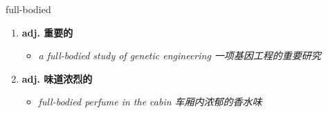 
\begin{frame}
{\huge full-bodied}
\begin{center}
\begin{enumerate}\Large
  \item \textbf{adj. 重要的}
  \begin{itemize}
    \item \em{\Large{a full-bodied study of genetic engineering 一项基因工程的重要研究}}
  \end{itemize}
  \item \textbf{adj. 味道浓烈的}
  \begin{itemize}
    \item \em{\Large{full-bodied perfume in the cabin 车厢内浓郁的香水味}}
  \end{itemize}
\end{enumerate}
\end{center}
\end{frame}
